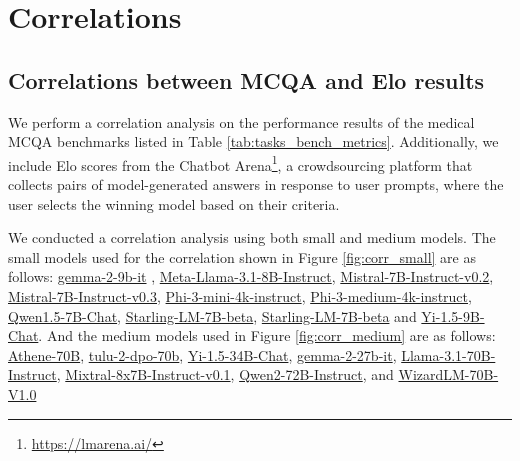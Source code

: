 \section{Correlations}\label{apx:correlations}


\subsection{Correlations between MCQA and Elo results}\label{apx:corr_elo}

We perform a correlation analysis on the performance results of the medical MCQA benchmarks listed in Table \ref{tab:tasks_bench_metrics}. Additionally, we include Elo scores from the Chatbot Arena\footnote{\url{https://lmarena.ai/}}, a crowdsourcing platform that collects pairs of model-generated answers in response to user prompts, where the user selects the winning model based on their criteria.

We conducted a correlation analysis using both small and medium models. The small models used for the correlation shown in Figure \ref{fig:corr_small} are as follows: \href{https://huggingface.co/google/gemma-2-9b-it}{gemma-2-9b-it} \cite{gemma_2024}, \href{https://huggingface.co/meta-llama/Meta-Llama-3-8B-Instruct}{Meta-Llama-3.1-8B-Instruct}\cite{llama3modelcard},
\href{https://huggingface.co/mistralai/Mistral-7B-Instruct-v0.2}{Mistral-7B-Instruct-v0.2}, 
\href{https://huggingface.co/mistralai/Mistral-7B-Instruct-v0.3}{Mistral-7B-Instruct-v0.3}, 
\href{https://huggingface.co/microsoft/Phi-3-mini-4k-instruct}{Phi-3-mini-4k-instruct}, 
\href{https://huggingface.co/microsoft/Phi-3-medium-4k-instruct}{Phi-3-medium-4k-instruct},
\href{https://huggingface.co/Qwen/Qwen1.5-7B-Chat}{Qwen1.5-7B-Chat},
\href{https://huggingface.co/unsloth/Starling-LM-7B-beta}{Starling-LM-7B-beta},
\href{https://huggingface.co/unsloth/Starling-LM-7B-beta}{Starling-LM-7B-beta} and
\href{https://huggingface.co/01-ai/Yi-1.5-9B-Chat}{Yi-1.5-9B-Chat}. And the medium models used in Figure \ref{fig:corr_medium} are as follows: \href{https://huggingface.co/Nexusflow/Athene-70B}{Athene-70B}\cite{Athene2024},
\href{https://huggingface.co/allenai/tulu-2-dpo-70b}{tulu-2-dpo-70b}\cite{ivison2023camels},
\href{https://huggingface.co/01-ai/Yi-1.5-34B-Chat}{Yi-1.5-34B-Chat},
\href{https://huggingface.co/google/gemma-2-27b-it}{gemma-2-27b-it},
\href{https://huggingface.co/meta-llama/Llama-3.1-70B-Instruct}{Llama-3.1-70B-Instruct},
\href{https://huggingface.co/mistralai/Mixtral-8x7B-Instruct-v0.1}{Mixtral-8x7B-Instruct-v0.1},
\href{https://huggingface.co/Qwen/Qwen2-72B-Instruct}{Qwen2-72B-Instruct}\cite{qwen2},
and \href{https://huggingface.co/WizardLMTeam/WizardLM-70B-V1.0}{WizardLM-70B-V1.0}




